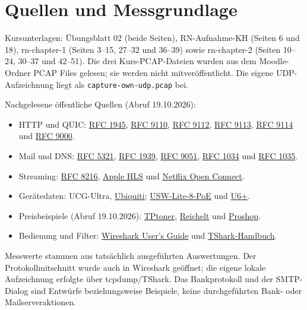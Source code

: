 \documentclass[a4paper,11pt]{article}
\begin{document}
\section*{Quellen und Messgrundlage}
Kursunterlagen: Übungsblatt 02 (beide Seiten), RN-Aufnahme-KH (Seiten 6 und 18), rn-chapter-1 (Seiten 3--15, 27--32 und 36--39) sowie rn-chapter-2 (Seiten 10--24, 30--37 und 42--51). Die drei Kurs-PCAP-Dateien wurden aus dem Moodle-Ordner PCAP Files gelesen; sie werden nicht mitveröffentlicht. Die eigene UDP-Aufzeichnung liegt als \texttt{capture-own-udp.pcap} bei.

Nachgelesene öffentliche Quellen (Abruf 19.10.2026):
\begin{itemize}[nosep]
\item HTTP und QUIC: \href{https://www.rfc-editor.org/rfc/rfc1945}{RFC 1945}, \href{https://www.rfc-editor.org/rfc/rfc9110}{RFC 9110}, \href{https://www.rfc-editor.org/rfc/rfc9112}{RFC 9112}, \href{https://www.rfc-editor.org/rfc/rfc9113}{RFC 9113}, \href{https://www.rfc-editor.org/rfc/rfc9114}{RFC 9114} und \href{https://www.rfc-editor.org/rfc/rfc9000}{RFC 9000}.
\item Mail und DNS: \href{https://www.rfc-editor.org/rfc/rfc5321}{RFC 5321}, \href{https://www.rfc-editor.org/rfc/rfc1939}{RFC 1939}, \href{https://www.rfc-editor.org/rfc/rfc9051}{RFC 9051}, \href{https://www.rfc-editor.org/rfc/rfc1034}{RFC 1034} und \href{https://www.rfc-editor.org/rfc/rfc1035}{RFC 1035}.
\item Streaming: \href{https://www.rfc-editor.org/rfc/rfc8216}{RFC 8216}, \href{https://developer.apple.com/streaming/}{Apple HLS} und \href{https://openconnect.netflix.com/en/}{Netflix Open Connect}.
\item Gerätedaten: UCG-Ultra, \href{https://techspecs.ui.com/unifi/cloud-gateways/ucg-ultra}{Ubiquiti}; \href{https://techspecs.ui.com/unifi/switching/usw-lite-8-poe}{USW-Lite-8-PoE} und \href{https://techspecs.ui.com/unifi/wifi/u6-plus}{U6+}.
\item Preisbeispiele (Abruf 19.10.2026): \href{https://www.tptoner.at/ubiquiti-ucg-ultra-unifi-cloud-gateway-ultra-276901at/}{TPtoner}, \href{https://www.reichelt.at/at/de/shop/produkt/switch_8-port_gigabit_ethernet_poe_-338038}{Reichelt} und \href{https://www.proshop.at/Access-Points/Ubiquiti-UniFi-Access-Point-U6-Plus/3193266}{Proshop}.
\item Bedienung und Filter: \href{https://www.wireshark.org/docs/wsug_html_chunked/ChapterWork.html}{Wireshark User's Guide} und \href{https://www.wireshark.org/docs/man-pages/tshark.html}{TShark-Handbuch}.
\end{itemize}
Messwerte stammen aus tatsächlich ausgeführten Auswertungen. Der Protokollmitschnitt wurde auch in Wireshark geöffnet; die eigene lokale Aufzeichnung erfolgte über tcpdump/TShark. Das Bankprotokoll und der SMTP-Dialog sind Entwürfe beziehungsweise Beispiele, keine durchgeführten Bank- oder Mailserveraktionen.
\end{document}
